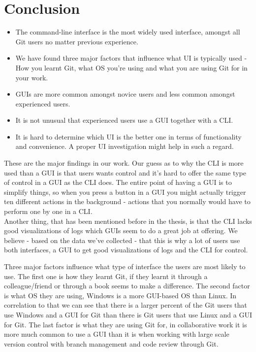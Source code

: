 \documentclass[a4paper,oneside]{bth} %
\begin{document}
		\chapter{Conclusion}
		\begin{itemize}
			\item The command-line interface is the most widely used interface, amongst all Git users no matter previous experience.
			\item We have found three major factors that influence what UI is typically used - How you learnt Git, what OS you're using and what you are using Git for in your work.
			\item GUIs are more common amongst novice users and less common amongst experienced users.
			\item It is not unusual that experienced users use a GUI together with a CLI.
			\item It is hard to determine which UI is the better one in terms of functionality and convenience. A proper UI investigation might help in such a regard.
		\end{itemize}
		
		These are the major findings in our work.
		Our guess as to why the CLI is more used than a GUI is that users wants control and it's hard to offer the same type of control in a GUI as the CLI does.
		The entire point of having a GUI is to simplify things, so when you press a button in a GUI you might actually trigger ten different actions in the background - actions that you normally would have to perform one by one in a CLI.\\
		Another thing, that has been mentioned before in the thesis, is that the CLI lacks good visualizations of logs which GUIs seem to do a great job at offering.
		We believe - based on the data we've collected - that this is why a lot of users use both interfaces, a GUI to get good visualizations of logs and the CLI for control.
		
		Three major factors influence what type of interface the users are most likely to use. The first one is how they learnt Git, if they learnt it through a colleague/friend or through a book seems to make a difference. The second factor is what OS they are using, Windows is a more GUI-based OS than Linux. In correlation to that we can see that there is a larger percent of the Git users that use Windows and a GUI for Git than there is Git users that use Linux and a GUI for Git.
		The last factor is what they are using Git for, in collaborative work it is more much common to use a GUI than it is when working with large scale version control with branch management and code review through Git.
		
\end{document}
